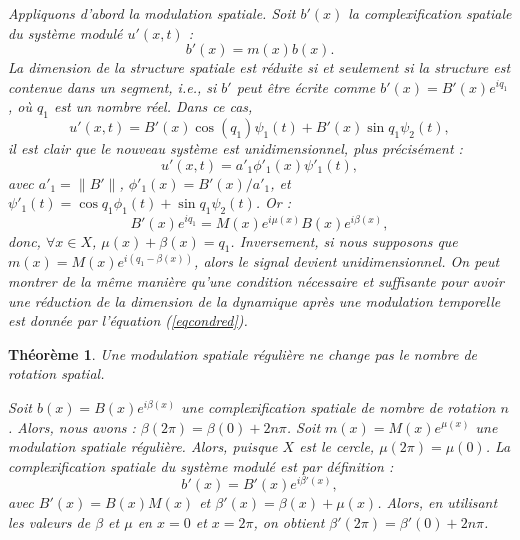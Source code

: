 \documentclass{book}
\newtheorem{thm}{Th\'eor\`eme}[chapter]
\newenvironment{pf}{{\bf Preuve.} \it}{\rm}
\begin{document}
\begin{pf}
Appliquons d'abord la modulation spatiale. Soit $b'(x)$ la
complexification spatiale du syst\`eme modul\'e $u'(x,t)$ :
\begin{equation}
b'(x)=m(x)b(x).
\end{equation}
La dimension de la structure spatiale est r\'eduite si et seulement si
la structure est contenue dans un segment, {\it i.e.}, si $b'$ peut
\^etre \'ecrite comme $b'(x)=B'(x)e^{iq_1}$, o\`u $q_1$ est un nombre
r\'eel. Dans ce cas,
\begin{equation}
u'(x,t)=B'(x)\cos(q_1)\psi_1(t)+B'(x)\sin q_1 \psi_2(t),
\end{equation}
il est clair que le nouveau syst\`eme est unidimensionnel, plus
pr\'ecis\'ement :
\begin{equation}
u'(x,t)=a'_1\phi'_1(x)\psi'_1(t),
\end{equation}
avec $a'_1=\|B'\|$, $\phi'_1(x)=B'(x)/a'_1$, et $\psi'_1(t)=\cos q_1
\phi_1(t)+\sin q_1 \psi_2(t)$.
Or :
\begin{equation}
B'(x)e^{i q_1}=M(x)e^{i\mu(x)}B(x)e^{i\beta(x)},
\end{equation}
donc, $\forall x\in X$, $\mu(x)+\beta(x)=q_1$. Inversement, si nous
supposons que $m(x)=M(x)e^{i(q_1-\beta(x))}$, alors le signal devient
unidimensionnel. On peut montrer de la m\^eme mani\`ere qu'une condition
n\'ecessaire et suffisante pour avoir une
r\'eduction de la dimension de la dynamique apr\`es une modulation
temporelle est donn\'ee par l'\'equation (\ref{eqcondred}).
\end{pf}

\begin{thm}
Une modulation spatiale r\'eguli\`ere
ne change pas le nombre de
rotation spatial.
\end{thm}
\begin{pf}
Soit $b(x)=B(x)e^{i\beta(x)}$ une complexification spatiale de nombre
de rotation $n$. Alors, nous avons : $\beta(2\pi)=\beta(0)+2n\pi$.
Soit $m(x)=M(x)e^{\mu(x)}$ une modulation spatiale r\'eguli\`ere.
Alors, puisque $X$ est le cercle, $\mu(2\pi)=\mu(0)$. La
complexification spatiale du syst\`eme modul\'e est par d\'efinition :
\begin{equation}
b'(x)=B'(x)e^{i\beta'(x)},
\end{equation}
avec $B'(x)=B(x)M(x)$ et $\beta'(x)=\beta(x)+\mu(x)$. Alors, en
utilisant les valeurs de $\beta$ et $\mu$ en $x=0$ et $x=2\pi$, on
obtient $\beta'(2\pi)=\beta'(0)+2n\pi$.
\end{pf}
\end{document}
